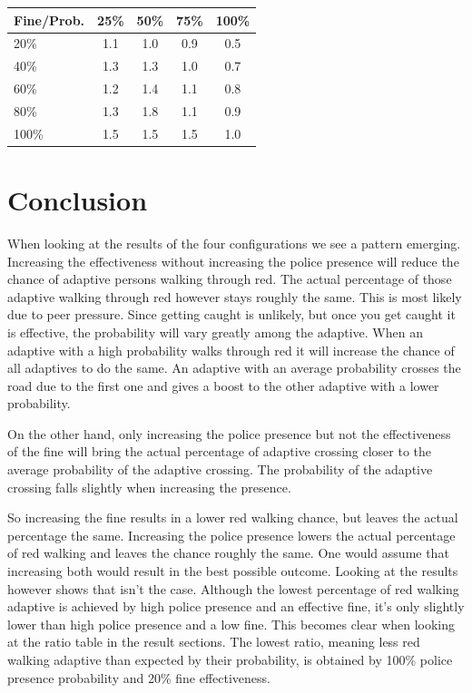 \documentclass[a4paper]{article}
\begin{document}
\begin{table}[H]
\centering
\begin{tabular}{ l | c c c c }
  Fine\slash Prob. & 25\% & 50\% & 75\% & 100\% \\ 
  \hline
  20\%  & 1.1 & 1.0 & 0.9 & 0.5  \\
  40\%  & 1.3 & 1.3 & 1.0 & 0.7  \\
  60\%  & 1.2 & 1.4 & 1.1 & 0.8  \\
  80\%  & 1.3 & 1.8 & 1.1 & 0.9  \\
  100\% & 1.5 & 1.5 & 1.5 & 1.0  \\
\end{tabular}
\end{table}

\clearpage

\section{Conclusion}
When looking at the results of the four configurations we see a pattern emerging. Increasing the effectiveness without increasing the police presence will reduce the chance of adaptive persons walking through red. The actual percentage of those adaptive walking through red however stays roughly the same. This is most likely due to peer pressure. Since getting caught is unlikely, but once you get caught it is effective, the probability will vary greatly among the adaptive. When an adaptive with a high probability walks through red it will increase the chance of all adaptives to do the same. An adaptive with an average probability crosses the road due to the first one and gives a boost to the other adaptive with a lower probability.

On the other hand, only increasing the police presence but not the effectiveness of the fine will bring the actual percentage of adaptive crossing closer to the average probability of the adaptive crossing. The probability of the adaptive crossing falls slightly when increasing the presence.

So increasing the fine results in a lower red walking chance, but leaves the actual percentage the same. Increasing the police presence lowers the actual percentage of red walking and leaves the chance roughly the same. One would assume that increasing both would result in the best possible outcome. Looking at the results however shows that isn't the case. Although the lowest percentage of red walking adaptive is achieved by high police presence and an effective fine, it's only slightly lower than high police presence and a low fine. This becomes clear when looking at the ratio table in the result sections. The lowest ratio, meaning less red walking adaptive than expected by their probability, is obtained by 100\% police presence probability and 20\% fine effectiveness.
\end{document}
